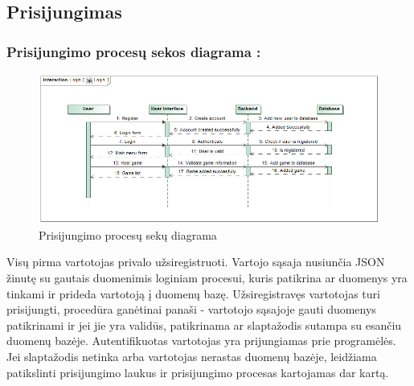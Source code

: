 \documentclass{VUMIFPSkursinis}
\begin{document}
	\subsection{Prisijungimas}
		\subsubsection*{Prisijungimo procesų sekos diagrama :}
		\begin{figure}[H]
			\centering
			\includegraphics[scale=0.5]{img/Login_sequence}
			\caption{Prisijungimo procesų sekų diagrama}
			\label{img:MainWindow_activity}
		\end{figure}
		Visų pirma vartotojas privalo užsiregistruoti. Vartojo sąsaja nusiunčia JSON 
		žinutę su gautais duomenimis loginiam procesui, kuris patikrina ar duomenys yra tinkami ir
		prideda vartotoją į duomenų bazę. Užsiregistravęs vartotojas turi prisijungti,
		procedūra ganėtinai panaši - vartotojo sąsajoje gauti duomenys patikrinami ir 
		jei jie yra validūs, patikrinama ar slaptažodis sutampa su esančiu duomenų
		bazėje. Autentifikuotas vartotojas yra prijungiamas prie programėlės. 
		Jei slaptažodis netinka arba vartotojas nerastas duomenų bazėje, leidžiama
		patikslinti prisijungimo laukus ir prisijungimo procesas kartojamas dar kartą.
\end{document}
